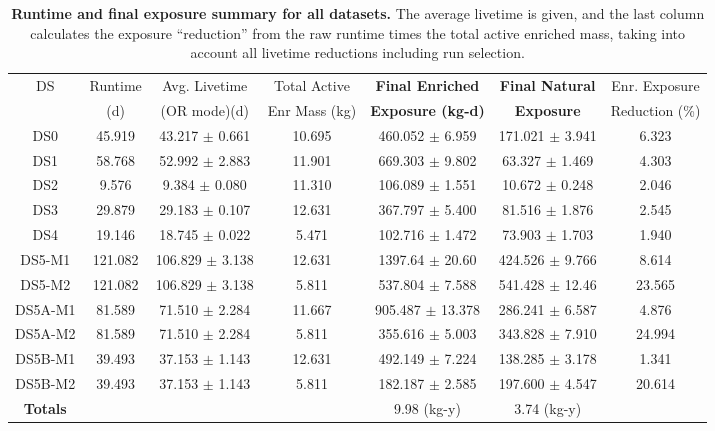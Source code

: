 \documentclass[notitlepage,rmp,aps,10pt]{revtex4-1}
\begin{document}
\begin{table*}[htb]
\begin{center}
\begin{tabular}{|c|c|c|c|c|c|c|}
\hline
DS & Runtime & Avg. Livetime           & Total Active  & \textbf{Final Enriched}   & \textbf{Final Natural} & Enr. Exposure \\
   & (d)     & (OR mode)(d)            & Enr Mass (kg) & \textbf{Exposure (kg-d)}  & \textbf{Exposure}      & Reduction (\%) \\
\hline
DS0 & 45.919 & 43.217 $\pm$ 0.661      & 10.695        & 460.052 $\pm$ 6.959       & 171.021 $\pm$ 3.941    & 6.323 \\
DS1 & 58.768 & 52.992 $\pm$ 2.883      & 11.901        & 669.303 $\pm$ 9.802       &  63.327 $\pm$ 1.469    & 4.303 \\
DS2 & 9.576  & 9.384 $\pm$ 0.080       & 11.310        & 106.089 $\pm$ 1.551       &  10.672 $\pm$ 0.248    & 2.046 \\
DS3 & 29.879 & 29.183 $\pm$ 0.107      & 12.631        & 367.797 $\pm$ 5.400       &  81.516 $\pm$ 1.876    & 2.545 \\
DS4 & 19.146 & 18.745 $\pm$ 0.022      & 5.471         & 102.716 $\pm$ 1.472       &  73.903 $\pm$ 1.703    & 1.940 \\
DS5-M1 & 121.082 & 106.829 $\pm$ 3.138 & 12.631        & 1397.64 $\pm$ 20.60       & 424.526 $\pm$ 9.766    & 8.614 \\
DS5-M2 & 121.082 & 106.829 $\pm$ 3.138 & 5.811         & 537.804 $\pm$ 7.588       & 541.428 $\pm$ 12.46    & 23.565 \\
DS5A-M1 & 81.589 & 71.510 $\pm$ 2.284  & 11.667        & 905.487 $\pm$ 13.378      & 286.241 $\pm$ 6.587    & 4.876 \\
DS5A-M2 & 81.589 & 71.510 $\pm$ 2.284  & 5.811         & 355.616 $\pm$ 5.003       & 343.828 $\pm$ 7.910    & 24.994 \\
DS5B-M1 & 39.493 & 37.153 $\pm$ 1.143  & 12.631        & 492.149 $\pm$ 7.224       & 138.285 $\pm$ 3.178    & 1.341 \\
DS5B-M2 & 39.493 & 37.153 $\pm$ 1.143  & 5.811         & 182.187 $\pm$ 2.585       & 197.600 $\pm$ 4.547    & 20.614 \\
\hline
\textbf{Totals} &  &  &  & 9.98 (kg-y) & 3.74 (kg-y) &  \\
\hline
\end{tabular}
\caption{\textbf{Runtime and final exposure summary for all datasets.} The average livetime is given, and the last column calculates the exposure ``reduction'' from the raw runtime times the total active enriched mass, taking into account all livetime reductions including run selection.}
\label{tab:FinalTable}
\end{center}
\end{table*}
\end{document}
